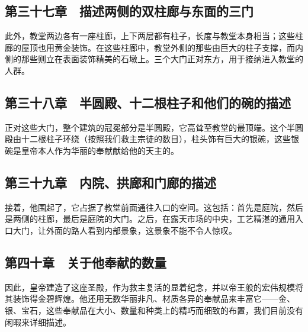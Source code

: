 
\subsection{第三十七章　描述两侧的双柱廊与东面的三门}

此外，教堂两边各有一座柱廊，上下两层都有柱子，长度与教堂本身相当；这些柱廊的屋顶也用黄金装饰。在这些柱廊中，教堂外侧的那些由巨大的柱子支撑，而内侧的那些则立在表面装饰精美的石墩上。三个大门正对东方，用于接纳进入教堂的人群。\par


\subsection{第三十八章　半圆殿、十二根柱子和他们的碗的描述}

正对这些大门，整个建筑的冠冕部分是半圆殿，它高耸至教堂的最顶端。这个半圆殿由十二根柱子环绕（按照我们救主宗徒的数目），柱头饰有巨大的银碗，这些银碗是皇帝本人作为华丽的奉献献给他的天主的。\par


\subsection{第三十九章　内院、拱廊和门廊的描述}

接着，他围起了，它占据了教堂前面通往入口的空间。这包括：首先是庭院，然后是两侧的柱廊，最后是庭院的大门。之后，在露天市场的中央，工艺精湛的通用入口大门，让外面的路人看到内部景象，这景象不能不令人惊叹。\par


\subsection{第四十章　关于他奉献的数量}

因此，皇帝建造了这座圣殿，作为救主复活的显着纪念，并以帝王般的宏伟规模将其装饰得金碧辉煌。他还用无数华丽非凡、材质各异的奉献品来丰富它——金、银、宝石，这些奉献品在大小、数量和种类上的精巧而细致的布置，我们目前没有闲暇来详细描述。\par

